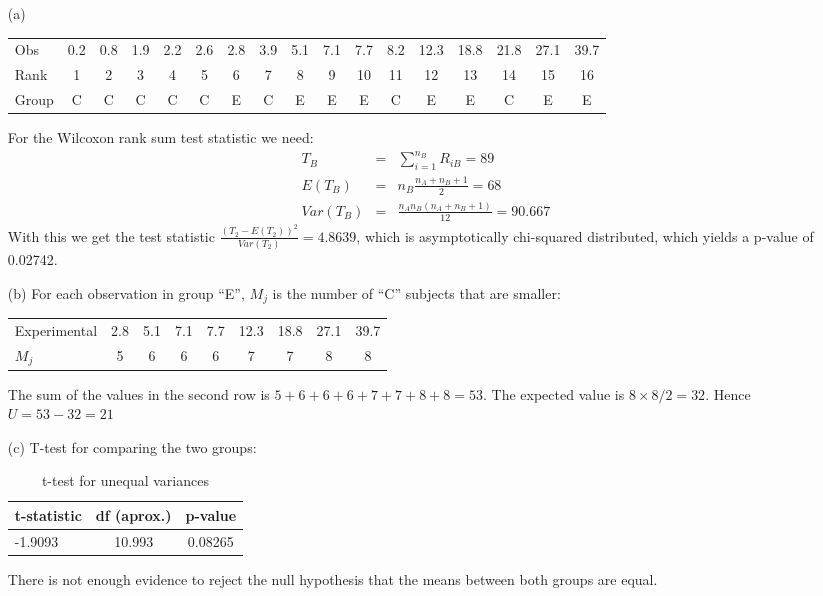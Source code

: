 \documentclass[11pt,a4paper]{article}
\begin{document}
\begin{enumerate}
\item[(a)]
\begin{table}[H]
\centering
\begin{tabular}{lcccccccccccccccc}
\hline
Obs 	& 0.2 & 0.8 & 1.9 & 2.2 & 2.6 & 2.8 & 3.9 & 5.1 & 7.1 & 7.7 & 8.2 & 12.3 & 18.8 & 21.8 & 27.1 & 39.7 \\
Rank  	& 1 & 2 & 3 & 4 & 5 & 6 & 7 & 8 & 9 & 10 & 11 & 12 & 13 & 14 & 15 & 16 \\ 
Group	& C & C & C & C & C & E & C & E & E & E & C & E & E & C & E & E \\
\hline
\end{tabular}
\end{table}
For the Wilcoxon rank sum test statistic we need:
\begin{eqnarray*}
T_B &=&\sum_{i=1}^{n_B} R_{iB}=89\\
E(T_B)&=&n_B\frac{n_A+n_B+1}{2}=68\\
Var(T_B)&=& \frac{n_An_B(n_A+n_B+1)}{12}=90.667
\end{eqnarray*}
With this we get the test statistic $\frac{(T_2-E(T_2))^2}{Var(T_2)}=4.8639$, which is asymptotically chi-squared distributed, which yields a p-value of 0.02742. 
\item[(b)] For each observation in group ``E'', $M_j$ is the number of ``C'' subjects that are smaller:
\begin{table}[H]
\centering
\begin{tabular}{lcccccccc}
\hline
Experimental 	& 2.8 & 5.1 & 7.1 & 7.7 & 12.3 & 18.8 & 27.1 & 39.7 \\
$M_j$  		& 5 & 6 & 6 & 6 & 7 & 7 & 8 & 8 \\ 
\hline
\end{tabular}
\end{table}
The sum of the values in the second row is $5 + 6 + 6 + 6 + 7 + 7 + 8 + 8 = 53$. The expected value is $8 × 8/2 = 32$. Hence $U = 53 − 32 = 21$

\item[(c)] T-test for comparing the two groups:
\begin{table}[H]
\centering
\begin{tabular}{lcc}
  \hline
t-statistic & df (aprox.) & p-value\\
\hline
-1.9093 & 10.993 & 0.08265\\
   \hline
\end{tabular}
\caption{t-test for unequal variances}
\end{table}

There is not enough evidence to reject the null hypothesis that the means between both groups are equal. 

\end{enumerate}
\end{document}
